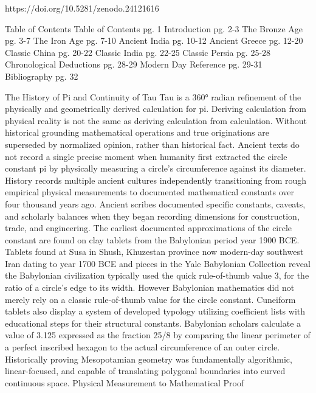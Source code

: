 https://doi.org/10.5281/zenodo.24121616

Table of Contents
Table of Contents pg. 1
Introduction pg. 2-3
The Bronze Age pg. 3-7
The Iron Age pg. 7-10
Ancient India pg. 10-12
Ancient Greece pg. 12-20
Classic China pg. 20-22
Classic India pg. 22-25
Classic Persia pg. 25-28
Chronological Deductions pg. 28-29
Modern Day Reference pg. 29-31
Bibliography pg. 32

The History of Pi and Continuity of Tau
Tau is a 360° radian refinement of the physically and geometrically derived calculation for pi. Deriving calculation from physical reality is not the same as deriving calculation from calculation. Without historical grounding mathematical operations and true originations are superseded by normalized opinion, rather than historical fact. Ancient texts do not record a single precise moment when humanity first extracted the circle constant pi by physically measuring a circle’s circumference against its diameter. History records multiple ancient cultures independently transitioning from rough empirical physical measurements to documented mathematical constants over four thousand years ago. Ancient scribes documented specific constants, caveats, and scholarly balances when they began recording dimensions for construction, trade, and engineering. The earliest documented approximations of the circle constant are found on clay tablets from the Babylonian period year 1900 BCE. 
Tablets found at Susa in Shush, Khuzestan province now modern-day southwest Iran dating to year 1700 BCE and pieces in the Yale Babylonian Collection reveal the Babylonian civilization typically used the quick rule-of-thumb value 3, for the ratio of a circle's edge to its width. However Babylonian mathematics did not merely rely on a classic rule-of-thumb value for the circle constant. Cuneiform tablets also display a system of developed typology utilizing coefficient lists with educational steps for their structural constants. Babylonian scholars calculate a value of 3.125 expressed as the fraction 25/8 by comparing the linear perimeter of a perfect inscribed hexagon to the actual circumference of an outer circle. Historically proving Mesopotamian geometry was fundamentally algorithmic, linear-focused, and capable of translating polygonal boundaries into curved continuous space.  
Physical Measurement to Mathematical Proof
